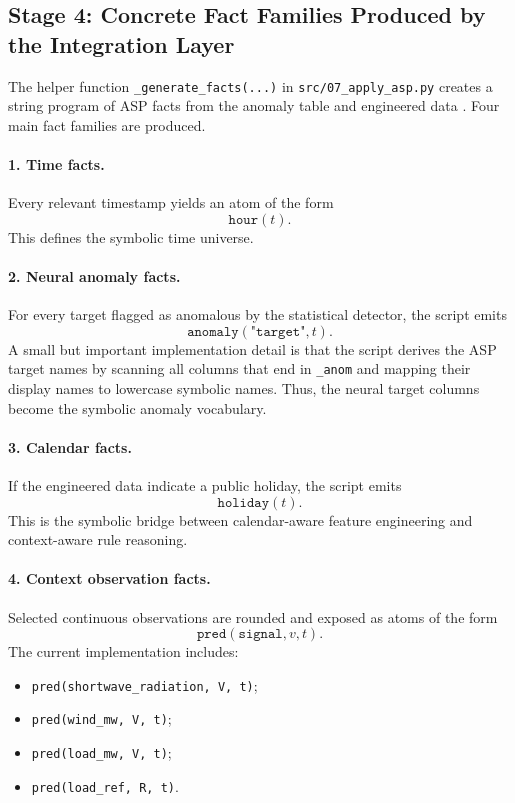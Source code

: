\subsection{Stage 4: Concrete Fact Families Produced by the Integration Layer}

The helper function \texttt{\_generate\_facts(...)} in \texttt{src/07\_apply\_asp.py} creates a string program of ASP facts from the anomaly table and engineered data \cite{repo_thesis_grid_anomaly}. Four main fact families are produced.

\paragraph{1. Time facts.}
Every relevant timestamp yields an atom of the form
\begin{equation}
	\texttt{hour}(t).
	\label{eq:hour_fact}
\end{equation}
This defines the symbolic time universe.

\paragraph{2. Neural anomaly facts.}
For every target flagged as anomalous by the statistical detector, the script emits
\begin{equation}
	\texttt{anomaly}(\texttt{"target"}, t).
	\label{eq:hybrid_anomaly_fact}
\end{equation}
A small but important implementation detail is that the script derives the ASP target names by scanning all columns that end in \texttt{\_anom} and mapping their display names to lowercase symbolic names. Thus, the neural target columns become the symbolic anomaly vocabulary.

\paragraph{3. Calendar facts.}
If the engineered data indicate a public holiday, the script emits
\begin{equation}
	\texttt{holiday}(t).
	\label{eq:hybrid_holiday_fact}
\end{equation}
This is the symbolic bridge between calendar-aware feature engineering and context-aware rule reasoning.

\paragraph{4. Context observation facts.}
Selected continuous observations are rounded and exposed as atoms of the form
\begin{equation}
	\texttt{pred}(\texttt{signal}, v, t).
	\label{eq:hybrid_pred_fact}
\end{equation}
The current implementation includes:
\begin{itemize}
	\item \texttt{pred(shortwave\_radiation, V, t)};
	\item \texttt{pred(wind\_mw, V, t)};
	\item \texttt{pred(load\_mw, V, t)};
	\item \texttt{pred(load\_ref, R, t)}.
\end{itemize}

